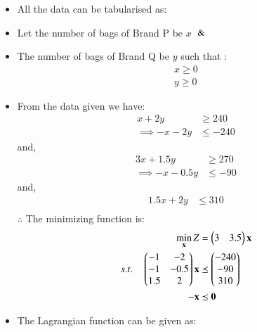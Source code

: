 \begin{itemize}
\item All the data can be tabularised as:
\begin{table}[!ht]
\centering
{}
\caption{Requirements of fertilizers}
\label{opt/30/tab:table2}
\end{table}
\item Let the number of bags of Brand P be $x$ $\And$
\item The number of bags of Brand Q be $y$ such that : 
\begin{align}
    x \geq 0 
    \\
    y \geq 0 
\end{align}
\item From the data given we have:
\begin{align}
    x+2y &\geq 240 \\
   \implies   -x-2y &\leq -240
\end{align}
and,
\begin{align}
    3x+1.5y &\geq 270 \\
    \implies -x-0.5y &\leq -90
\end{align}
and,
\begin{align}
     1.5x+2y &\leq 310 \\
\end{align}
$\therefore$ The minimizing function is:
\begin{align}
        \min_{\mathbf{x}} Z &= \begin{pmatrix}3& 3.5\end{pmatrix}\mathbf{x}\\
        s.t. \quad 
        \begin{pmatrix}-1 & -2\\ -1 & -0.5 \\ 1.5 & 2 \end{pmatrix}\mathbf{x} &\preceq \begin{pmatrix}-240\\-90\\310\end{pmatrix} \\
        \mathbf{-x} &\preceq \mathbf{0}
\end{align}
\item The Lagrangian function can be given as:

\end{itemize}
